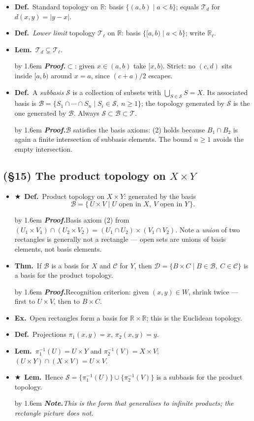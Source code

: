 \documentclass[12pt,a4paper]{article}
\newcommand{\Dfn}{\textbf{Def.}~}
\newcommand{\Thm}{\textbf{Thm.}~}
\newcommand{\Lem}{\textbf{Lem.}~}
\newcommand{\Exa}{\textbf{Ex.}~}
\newcommand{\Key}{$\bigstar$~}                  %
\newcommand{\Pf}[1]{%
  \par\addvspace{7pt}\nopagebreak
  \begingroup
    \advance\leftskip by 1.6em
    \parindent=0pt \small\color{prf}%
    \textbf{\textit{Proof.}}\enspace #1\par
  \endgroup
  \addvspace{9pt}}
\newcommand{\Cue}[1]{%
  \par\addvspace{7pt}\nopagebreak
  \begingroup
    \advance\leftskip by 1.6em
    \parindent=0pt \small\color{cue}%
    \textbf{\textit{Note.}}\enspace \textit{#1}\par
  \endgroup
  \addvspace{9pt}}
\newenvironment{BL}%
  {\begin{itemize}[leftmargin=1.4em,labelsep=0.55em,itemsep=11pt,topsep=11pt,parsep=0pt]}%
  {\end{itemize}}
\newcommand{\RR}{\mathbb{R}}
\newcommand{\cT}{\mathcal{T}}
\newcommand{\cB}{\mathcal{B}}
\newcommand{\cS}{\mathcal{S}}
\newcommand{\cC}{\mathcal{C}}
\newcommand{\cD}{\mathcal{D}}
\begin{document}
\begin{BL}
      topology.
\item \Dfn Standard topology on $\RR$: basis $\{(a,b)\mid a<b\}$; equals $\cT_d$ for $d(x,y)=|y-x|$.
\item \Dfn \emph{Lower limit} topology $\cT_\ell$ on $\RR$: basis $\{[a,b)\mid a<b\}$;
      write $\RR_\ell$.
\item \Lem $\cT_d\subsetneq\cT_\ell$.
\Pf{$\subset$: given $x\in(a,b)$ take $[x,b)$. Strict: no $(c,d)$ sits inside $[a,b)$ around
$x=a$, since $(c+a)/2$ escapes.}
\item \Dfn A \emph{subbasis} $\cS$ is a collection of subsets with $\bigcup_{S\in\cS}S=X$.
      Its associated basis is
      $\cB=\{S_1\cap\cdots\cap S_n\mid S_i\in\cS,\ n\ge1\}$;
      the topology generated by $\cS$ is the one generated by $\cB$. Always $\cS\subset\cB\subset\cT$.
\Pf{$\cB$ satisfies the basis axioms: (2) holds because $B_1\cap B_2$ is again a finite
intersection of subbasis elements. The bound $n\ge1$ avoids the empty intersection.}
\end{BL}

\subsection{(\S15) The product topology on \texorpdfstring{$X\times Y$}{X x Y}}

\begin{BL}
\item \Key\Dfn Product topology on $X\times Y$: generated by the basis
  \[ \cB=\{\,U\times V\mid U\text{ open in }X,\ V\text{ open in }Y\,\}. \]
\Pf{Basis axiom (2) from $(U_1\times V_1)\cap(U_2\times V_2)=(U_1\cap U_2)\times(V_1\cap V_2)$.
Note a \emph{union} of two rectangles is generally not a rectangle --- open sets are unions
of basis elements, not basis elements.}
\item \Thm If $\cB$ is a basis for $X$ and $\cC$ for $Y$, then
      $\cD=\{B\times C\mid B\in\cB,\ C\in\cC\}$ is a basis for the product topology.
\Pf{Recognition criterion: given $(x,y)\in W$, shrink twice --- first to $U\times V$, then to
$B\times C$.}
\item \Exa Open rectangles form a basis for $\RR\times\RR$; this is the Euclidean topology.
\item \Dfn Projections $\pi_1(x,y)=x$, $\pi_2(x,y)=y$.
\item \Lem $\pi_1^{-1}(U)=U\times Y$ and $\pi_2^{-1}(V)=X\times V$;\quad
      $(U\times Y)\cap(X\times V)=U\times V$.
\item \Key\Lem Hence
      \(\cS=\{\pi_1^{-1}(U)\}\cup\{\pi_2^{-1}(V)\}\)
      is a subbasis for the product topology.
\Cue{This is the form that generalises to infinite products; the rectangle picture does not.}
\end{BL}
\end{document}
